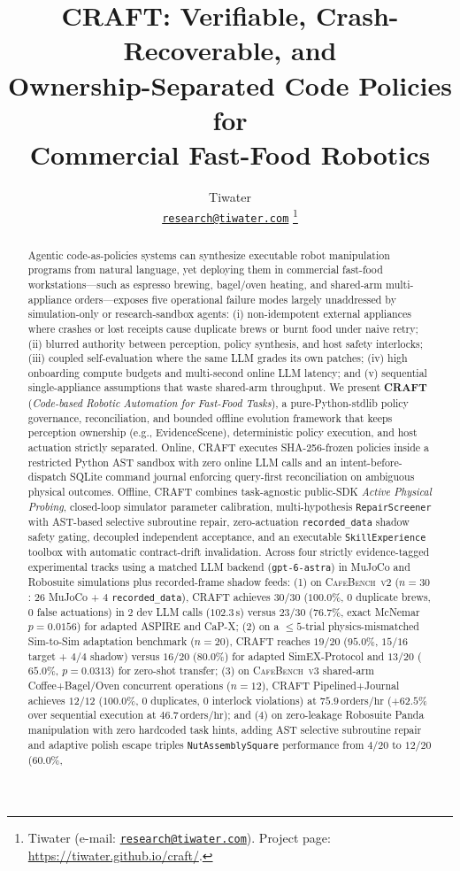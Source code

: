 \documentclass[10pt,journal]{IEEEtran}
\title{CRAFT: Verifiable, Crash-Recoverable, and\\ Ownership-Separated Code Policies for\\ Commercial Fast-Food Robotics}
\author{Tiwater\\
{\normalsize\href{mailto:research@tiwater.com}{\texttt{research@tiwater.com}}}%
\thanks{Tiwater (e-mail: \href{mailto:research@tiwater.com}{\texttt{research@tiwater.com}}). Project page: \url{https://tiwater.github.io/craft/}.}}
\begin{document}
\sloppy
\maketitle

\begin{abstract}\normalfont
Agentic code-as-policies systems can synthesize executable robot manipulation programs from natural language, yet deploying them in commercial fast-food workstations---such as espresso brewing, bagel/oven heating, and shared-arm multi-appliance orders---exposes five operational failure modes largely unaddressed by simulation-only or research-sandbox agents: (i) non-idempotent external appliances where crashes or lost receipts cause duplicate brews or burnt food under naive retry; (ii) blurred authority between perception, policy synthesis, and host safety interlocks; (iii) coupled self-evaluation where the same LLM grades its own patches; (iv) high onboarding compute budgets and multi-second online LLM latency; and (v) sequential single-appliance assumptions that waste shared-arm throughput. We present \textbf{CRAFT} (\emph{Code-based Robotic Automation for Fast-Food Tasks}), a pure-Python-stdlib policy governance, reconciliation, and bounded offline evolution framework that keeps perception ownership (e.g., EvidenceScene), deterministic policy execution, and host actuation strictly separated. Online, CRAFT executes SHA-256-frozen policies inside a restricted Python AST sandbox with zero online LLM calls and an intent-before-dispatch SQLite command journal enforcing query-first reconciliation on ambiguous physical outcomes. Offline, CRAFT combines task-agnostic public-SDK \emph{Active Physical Probing}, closed-loop simulator parameter calibration, multi-hypothesis \texttt{RepairScreener} with AST-based selective subroutine repair, zero-actuation \texttt{recorded\_data} shadow safety gating, decoupled independent acceptance, and an executable \texttt{SkillExperience} toolbox with automatic contract-drift invalidation. Across four strictly evidence-tagged experimental tracks using a matched LLM backend (\texttt{gpt-6-astra}) in MuJoCo and Robosuite simulations plus recorded-frame shadow feeds: (1) on \textsc{CafeBench~v2} ($n{=}30$: $26$ MuJoCo + $4$ \texttt{recorded\_data}), CRAFT achieves $30/30$ ($100.0\%$, $0$ duplicate brews, $0$ false actuations) in $2$ dev LLM calls ($102.3\,\mathrm{s}$) versus $23/30$ ($76.7\%$, exact McNemar $p{=}0.0156$) for adapted ASPIRE and CaP-X; (2) on a $\le 5$-trial physics-mismatched Sim-to-Sim adaptation benchmark ($n{=}20$), CRAFT reaches $19/20$ ($95.0\%$, $15/16$ target + $4/4$ shadow) versus $16/20$ ($80.0\%$) for adapted SimEX-Protocol and $13/20$ ($65.0\%$, $p{=}0.0313$) for zero-shot transfer; (3) on \textsc{CafeBench~v3} shared-arm Coffee+Bagel/Oven concurrent operations ($n{=}12$), CRAFT Pipelined+Journal achieves $12/12$ ($100.0\%$, $0$ duplicates, $0$ interlock violations) at $75.9\,\text{orders/hr}$ ($+62.5\%$ over sequential execution at $46.7\,\text{orders/hr}$); and (4) on zero-leakage Robosuite Panda manipulation with zero hardcoded task hints, adding AST selective subroutine repair and adaptive polish escape triples \texttt{NutAssemblySquare} performance from $4/20$ to $12/20$ ($60.0\%$, 
\end{abstract}
\end{document}
